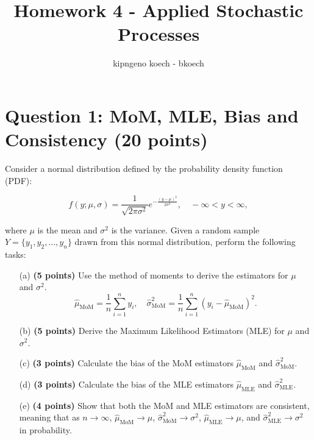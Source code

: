 \documentclass{article}
\begin{document}
\author{kipngeno koech - bkoech}
\title{Homework 4 - Applied Stochastic Processes}   
\maketitle

\medskip

\section*{Question 1: MoM, MLE, Bias and Consistency (20 points)}

Consider a normal distribution defined by the probability density function (PDF):

\[
f(y; \mu, \sigma) = \frac{1}{\sqrt{2\pi\sigma^2}} e^{-\frac{(y - \mu)^2}{2\sigma^2}}, \quad -\infty < y < \infty,
\]

\noindent where \(\mu\) is the mean and \(\sigma^2\) is the variance. Given a random sample \(Y = \{ y_1, y_2, \ldots, y_n \}\) drawn from this normal distribution, perform the following tasks:

\begin{enumerate}
    \item[(a)] \textbf{(5 points)} Use the method of moments to derive the estimators for \(\mu\) and \(\sigma^2\).
    \[
    \hat{\mu}_{\text{MoM}} = \frac{1}{n} \sum_{i=1}^{n} y_i, \quad \hat{\sigma}^2_{\text{MoM}} = \frac{1}{n} \sum_{i=1}^{n} (y_i - \hat{\mu}_{\text{MoM}})^2.
    \]

     \item[(b)] \textbf{(5 points)} Derive the Maximum Likelihood Estimators (MLE) for \(\mu\) and \(\sigma^2\).

     \item[(c)] \textbf{(3 points)} Calculate the bias of the MoM estimators \(\hat{\mu}_{\text{MoM}}\) and \(\hat{\sigma}^2_{\text{MoM}}\).
     
    \item[(d)] \textbf{(3 points)} Calculate the bias of the MLE estimators \(\hat{\mu}_{\text{MLE}}\) and \(\hat{\sigma}^2_{\text{MLE}}\).

    \item[(e)] \textbf{(4 points)} Show that both the MoM and MLE estimators are consistent, meaning that as \(n \to \infty\), \(\hat{\mu}_{\text{MoM}} \to \mu\), \(\hat{\sigma}^2_{\text{MoM}} \to \sigma^2\), \(\hat{\mu}_{\text{MLE}} \to \mu\), and \(\hat{\sigma}^2_{\text{MLE}} \to \sigma^2\) in probability.
\end{enumerate}
    
\end{document}
